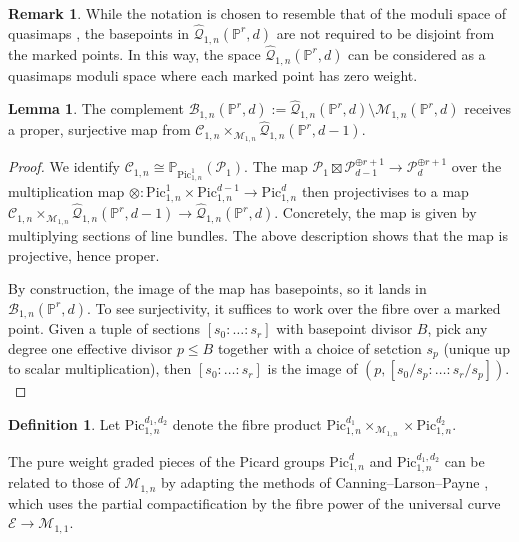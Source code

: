 \documentclass[12pt,reqno]{amsart}
\theoremstyle{definition}
\theoremstyle{definition}
\theoremstyle{definition}
\theoremstyle{definition}
\newtheorem{lemma}[theorem]{Lemma}
\newtheorem{remark}[theorem]{Remark}
\newtheorem{definition}[theorem]{Definition}
\newcommand{\PP}{\mathbb{P}}
\begin{document}
\begin{remark}
  While the notation is chosen to resemble that of the moduli space of quasimaps \cite{mop}, the basepoints in $\hat{\mathcal{Q}}_{1,n}(\mathbb{P}^r,d)$ are not required to be disjoint from the marked points. In this way, the space $\hat{\mathcal{Q}}_{1,n}(\mathbb{P}^r,d)$ can be considered as a quasimaps moduli space where each marked point has zero weight.
\end{remark}

\begin{lemma}\label{lem:propsurj}
  The complement $\mathcal{B}_{1,n}(\mathbb{P}^r,d):= \hat{\mathcal{Q}}_{1,n}(\PP^r,d)\setminus \mathcal{M}_{1,n}(\PP^r,d)$ receives a proper, surjective map from $\mathcal{C}_{1,n}\times_{\mathcal{M}_{1,n}}\hat{\mathcal{Q}}_{1,n}(\mathbb{P}^r,d-1)$.
\end{lemma}
\begin{proof}
  We identify $\mathcal{C}_{1,n}\cong \mathbb{P}_{\mathrm{Pic}_{1,n}^{1}}(\mathcal{P}_1).$ The map $\mathcal{P}_1\boxtimes \mathcal{P}_{d-1}^{\oplus r+1}\to \mathcal{P}_d^{\oplus r+1}$ over the multiplication map $\otimes: \mathrm{Pic}_{1,n}^1\times \mathrm{Pic}_{1,n}^{d-1}\to \mathrm{Pic}_{1,n}^{d}$ then projectivises to a map $\mathcal{C}_{1,n}\times_{\mathcal{M}_{1,n}}\hat{\mathcal{Q}}_{1,n}(\mathbb{P}^r,d-1)\to \hat{\mathcal{Q}}_{1,n}(\mathbb{P}^r,d).$ Concretely, the map is given by multiplying sections of line bundles. The above description shows that the map is projective, hence proper.

  By construction, the image of the map has basepoints, so it lands in $\mathcal{B}_{1,n}(\mathbb{P}^r,d).$ To see surjectivity, it suffices to work over the fibre over a marked point. Given a tuple of sections $[s_0:\dots:s_r]$ with basepoint divisor $B$, pick any degree one effective divisor $p\leq B$ together with a choice of setction $s_p$ (unique up to scalar multiplication), then $[s_0:\dots:s_r]$ is the image of $(p,[s_0/s_p:\dots: s_r/s_p]).$
\end{proof}

\begin{definition}
  Let $\mathrm{Pic}^{d_1,d_2}_{1,n}$ denote the fibre product $\mathrm{Pic}^{d_1}_{1,n}\times_{\mathcal{M}_{1,n}}\times \mathrm{Pic}^{d_2}_{1,n}$.
\end{definition}

The pure weight graded pieces of the Picard groups $\mathrm{Pic}^{d}_{1,n}$ and $\mathrm{Pic}^{d_1,d_2}_{1,n}$ can be related to those of $\mathcal{M}_{1,n}$ by adapting the methods of Canning--Larson--Payne \cite[§2.2]{clp}, which uses the partial compactification by the fibre power of the universal curve $\mathcal{E}\to \mathcal{M}_{1,1}.$
\end{document}
